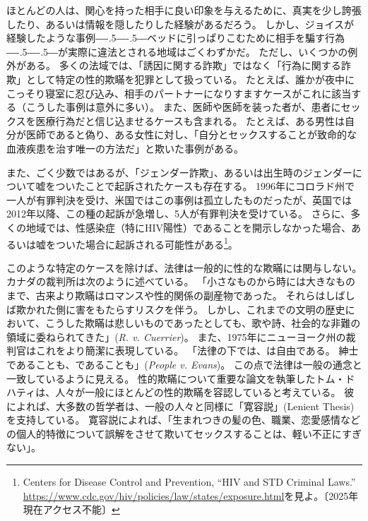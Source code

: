 \documentclass[paper=a4,book,openany]{jlreq}
\def\DDASH{―\kern-.5\zw―\kern-.5\zw―} %
\begin{document}
ほとんどの人は、関心を持った相手に良い印象を与えるために、真実を少し誇張したり、あるいは情報を隠したりした経験があるだろう。
しかし、ジョイスが経験したような事例{\DDASH}ベッドに引っぱりこむために相手を騙す行為{\DDASH}が実際に違法とされる地域はごくわずかだ。
ただし、いくつかの例外がある。
多くの法域では、「誘因に関する詐欺」ではなく「行為に関する詐欺」として特定の性的欺瞞を犯罪として扱っている。
たとえば、誰かが夜中にこっそり寝室に忍び込み、相手のパートナーになりすますケースがこれに該当する（こうした事例は意外に多い）。
また、医師や医師を装った者が、患者にセックスを医療行為だと信じ込ませるケースも含まれる。
たとえば、ある男性は自分が医師であると偽り、ある女性に対し、「自分とセックスすることが致命的な血液疾患を治す唯一の方法だ」と欺いた事例がある\citep{chavez87:_woman_says_ruse_trick_her_sex}。

また、ごく少数ではあるが、「ジェンダー詐欺」、あるいは出生時のジェンダーについて嘘をついたことで起訴されたケースも存在する。
1996年にコロラド州で一人が有罪判決を受け、米国ではこの事例は孤立したものだったが、英国では2012年以降、この種の起訴が急増し、5人が有罪判決を受けている\citep{wilkinson17:_troub_case_uk_woman_convic_gender_fraud}。
さらに、多くの地域では、性感染症（特にHIV陽性）であることを開示しなかった場合、あるいは嘘をついた場合に起訴される可能性がある\footnote{Centers for Disease Control and Prevention, ``HIV and STD Criminal Laws.'' \url{https://www.cdc.gov/hiv/policies/law/states/exposure.html}を見よ。〔2025年現在アクセス不能〕}。

このような特定のケースを除けば、法律は一般的に性的な欺瞞には関与しない。
カナダの裁判所は次のように述べている。
「小さなものから時には大きなものまで、古来より欺瞞はロマンスや性的関係の副産物であった。
それらはしばしば欺かれた側に害をもたらすリスクを伴う。
しかし、これまでの文明の歴史において、こうした欺瞞は悲しいものであったとしても、歌や詩、社会的な非難の領域に委ねられてきた」(\emph{R. v. Cuerrier})。
また、1975年にニューヨーク州の裁判官はこれをより簡潔に表現している。
「法律の下では、は自由である。
紳士であることも、であることも」(\emph{People v. Evans})。
この点で法律は一般の通念と一致しているように見える。
性的欺瞞について重要な論文を執筆したトム・ドハティは、人々が一般にほとんどの性的欺瞞を容認していると考えている。
彼によれば、大多数の哲学者は、一般の人々と同様に「寛容説」(Lenient Thesis)を支持している。
寛容説によれば、「生まれつきの髪の色、職業、恋愛感情などの個人的特徴について誤解をさせて欺いてセックスすることは、軽い不正にすぎない」\citep[p.718]{dougherty13:_sex_lies_consen}。
\end{document}
